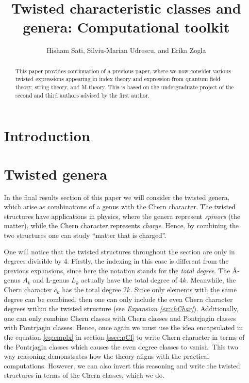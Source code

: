 \documentclass{amsart}
\theoremstyle{plain}
\numberwithin{equation}{section}
\begin{document}
\title{Twisted characteristic classes and genera: Computational toolkit}

 
\author{Hisham Sati, Silviu-Marian Udrescu, and Erika Zogla}
 

\maketitle
 
\begin{abstract}
	This paper provides continuation of a previous paper, where we now consider various twisted
	expressions appearing in index theory and expression from quantum field theory, string theory,
	 and M-theory. This is based on the undergraduate project of the second 
	and third authors advised by the first author.  
	
\end{abstract} 

 
\tableofcontents


 
\section{Introduction}


\medskip
\section{Twisted genera} \label{sec:twsitedG}

In the final results section of this paper we will consider the twisted genera, which arise as 
combinations of a genus with the Chern character. The twisted structures have applications 
in physics, where the genera represent \textit{spinors} (the matter), while the Chern 
character represents \textit{charge}. Hence, by combining the two structures one can
 study ``matter that is charged''.

\medskip
One will notice that the twisted structures throughout the section are only in degrees divisible by 4. 
Firstly, the indexing in this case is different from the previous expansions, since here the notation 
stands for the \textit{total degree}. The \^{A}-genus $ A_k $ and L-genus $ L_k $ actually have
 the total degree of $ 4k $. Meanwhile, the Chern character $ c_k $ has the total degree $ 2k $. 
 Since only elements with the same degree can be combined, then one can only include the even
  Chern character degrees within the twisted structure (see \textit{Expansion \ref{ex:chChar}}).
   Additionally, one can only combine Chern classes with Chern classes and Pontrjagin classes 
   with Pontrjagin classes. Hence, once again we must use the idea encapsulated in the equation
    \ref{eq:cmplx} in section \ref{ssec:pCl} to write Chern character in terms of the Pontrjagin 
    classes which causes the even degree classes to vanish. This two way reasoning demonstrates 
    how the theory aligns with the practical computations. However, we can also invert this 
    reasoning and write the twisted structures in terms of the Chern classes, which we do.
\end{document}
